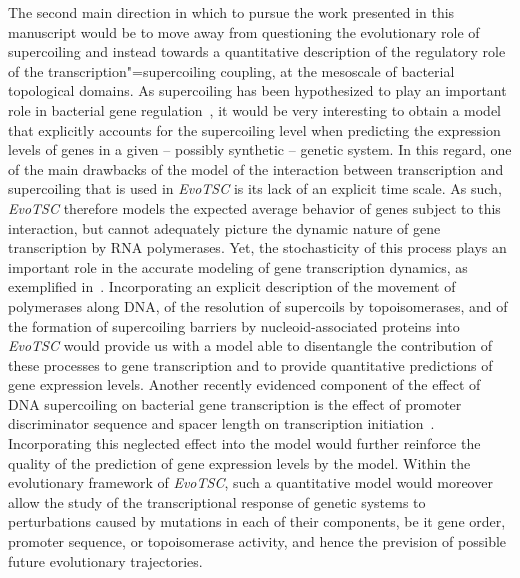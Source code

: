 The second main direction in which to pursue the work presented in this manuscript would be to move away from questioning the evolutionary role of supercoiling and instead towards a quantitative description of the regulatory role of the transcription"=supercoiling coupling, at the mesoscale of bacterial topological domains.
As supercoiling has been hypothesized to play an important role in bacterial gene regulation~\citep{elhoudaigui2019}, it would be very interesting to obtain a model that explicitly accounts for the supercoiling level when predicting the expression levels of genes in a given -- possibly synthetic -- genetic system.
In this regard, one of the main drawbacks of the model of the interaction between transcription and supercoiling that is used in \emph{EvoTSC} is its lack of an explicit time scale.
As such, \emph{EvoTSC} therefore models the expected average behavior of genes subject to this interaction, but cannot adequately picture the dynamic nature of gene transcription by RNA polymerases.
Yet, the stochasticity of this process plays an important role in the accurate modeling of gene transcription dynamics, as exemplified in~\cite{sevier2021}.
Incorporating an explicit description of the movement of polymerases along DNA, of the resolution of supercoils by topoisomerases, and of the formation of supercoiling barriers by nucleoid-associated proteins into \emph{EvoTSC} would provide us with a model able to disentangle the contribution of these processes to gene transcription and to provide quantitative predictions of gene expression levels.
Another recently evidenced component of the effect of DNA supercoiling on bacterial gene transcription is the effect of promoter discriminator sequence and spacer length on transcription initiation~\citep{forquet2021,forquet2022,pineau2022a}.
Incorporating this neglected effect into the model would further reinforce the quality of the prediction of gene expression levels by the model.
Within the evolutionary framework of \emph{EvoTSC}, such a quantitative model would moreover allow the study of the transcriptional response of genetic systems to perturbations caused by mutations in each of their components, be it gene order, promoter sequence, or topoisomerase activity, and hence the prevision of possible future evolutionary trajectories.
